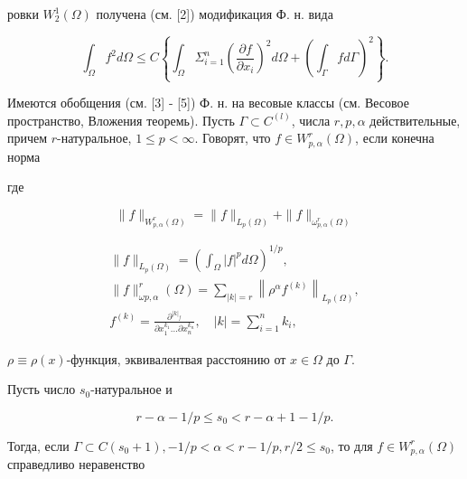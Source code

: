 \documentclass[10pt]{article}
\begin{document}
ровки $W_{2}^{1}(\Omega)$ получена (см. [2]) модификация Ф. н. вида



\[

\int_{\Omega} f^{2} d \Omega \leqslant C\left\{\int_{\Omega} \Sigma_{i=1}^{n}\left(\frac{\partial f}{\partial x_{i}}\right)^{2} d \Omega+\left(\int_{\Gamma} f d \Gamma\right)^{2}\right\} .

\]



Имеются обобщения (см. [3] - [5]) Ф. н. на весовые классы (см. Весовое пространство, Вложения теоремь). Пусть $\Gamma \subset C^{(l)}$, числа $r, p, \alpha$ действительные, причем $r$-натуральное, $1 \leqslant p<\infty$. Говорят, что $f \in W_{p, \alpha}^{r}(\Omega)$, если конечна норма



где



\[

\|f\|_{W_{p, \alpha}^{r}(\Omega)}=\|f\|_{L_{p}(\Omega)}+\|f\|_{\omega_{p, \alpha}^{r}(\Omega)}

\]



\[

\begin{gathered}

\|f\|_{L_{p}(\Omega)}=\left(\int_{\Omega}|f|^{p} d \Omega\right)^{1 / p}, \\

\|f\|_{\omega p, \alpha}^{r}(\Omega)=\sum_{|k|=r}\left\|\rho^{\alpha} f^{(k)}\right\|_{L_{p}(\Omega)}, \\

f^{(k)}=\frac{\partial^{|k|_{f}}}{\partial x_{1}^{k_{1}} \ldots \partial x_{n}^{k_{n}}}, \quad|k|=\sum_{i=1}^{n} k_{i},

\end{gathered}

\]



$\rho \equiv \rho(x)$-функция, эквивалентвая расстоянию от $x \in \Omega$ до $\Gamma$.



Пусть число $s_{0}$-натуральное и



\[

r-\alpha-1 / p \leqslant s_{0}<r-\alpha+1-1 / p .

\]



Тогда, если $\Gamma \subset C\left(s_{0}+1\right),-1 / p<\alpha<r-1 / p, r / 2 \leqslant s_{0}$, то для $f \in W_{p, \alpha}^{r}(\Omega)$ справедливо неравенство
\end{document}
